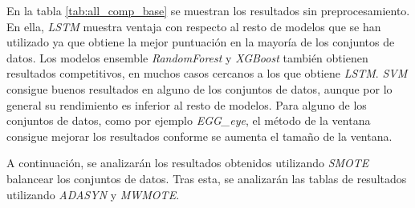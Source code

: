 En la tabla \ref{tab:all_comp_base} se muestran los resultados sin preprocesamiento. En ella, \textit{LSTM} muestra ventaja con respecto al resto de modelos que se han utilizado ya que obtiene la mejor puntuación en la mayoría de los conjuntos de datos. Los modelos ensemble \textit{RandomForest} y \textit{XGBoost} también obtienen resultados competitivos, en muchos casos cercanos a los que obtiene \textit{LSTM}. \textit{SVM} consigue buenos resultados en alguno de los conjuntos de datos, aunque por lo general su rendimiento es inferior al resto de modelos. Para alguno de los conjuntos de datos, como por ejemplo \textit{EGG\_eye}, el método de la ventana consigue mejorar los resultados conforme se aumenta el tamaño de la ventana.\newline


A continuación, se analizarán los resultados obtenidos utilizando \newline \textit{SMOTE} balancear los conjuntos de datos. Tras esta, se analizarán las tablas de resultados utilizando \textit{ADASYN} y \textit{MWMOTE}.

